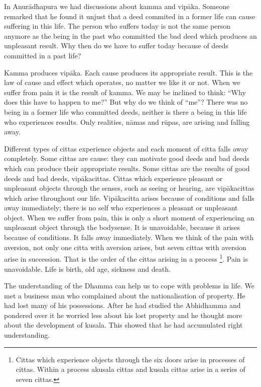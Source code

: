 In Anurādhapura we had discussions about kamma and vipāka. Someone
remarked that he found it unjust that a deed commited in a former life
can cause suffering in this life. The person who suffers today is not
the same person anymore as the being in the past who committed the bad
deed which produces an unpleasant result. Why then do we have to suffer
today because of deeds committed in a past life?

Kamma produces vipāka. Each cause produces its appropriate result. This
is the law of cause and effect which operates, no matter we like it or
not. When we suffer from pain it is the result of kamma. We may be
inclined to think: ``Why does this have to happen to me?'' But why do we
think of ``me''? There was no being in a former life who committed
deeds, neither is there a being in this life who experiences results.
Only realities, nāmas and rūpas, are arising and falling away.

Different types of cittas experience objects and each moment of citta
falls away completely. Some cittas are cause: they can motivate good
deeds and bad deeds which can produce their appropriate results. Some
cittas are the results of good deeds and bad deeds, vipākacittas. Cittas
which experience pleasant or unpleasant objects through the senses, such
as seeing or hearing, are vipākacittas which arise throughout our life.
Vipākacitta arises because of conditions and falls away immediately;
there is no self who experiences a pleasant or unpleasant object. When
we suffer from pain, this is only a short moment of experiencing an
unpleasant object through the bodysense. It is unavoidable, because it
arises because of conditions. It falls away immediately. When we think
of the pain with aversion, not only one citta with aversion arises, but
seven cittas with aversion arise in succession. That is the order of the
cittas arising in a process
\footnote{Cittas which experience objects
through the six doors arise in processes of cittas. Within a process
akusala cittas and kusala cittas arise in a series of seven cittas.
}.
Pain is unavoidable. Life is birth, old age, sickness and death.

The understanding of the Dhamma can help us to cope with problems in
life. We met a business man who complained about the nationalisation of
property. He had lost many of his possessions. After he had studied the
Abhidhamma and pondered over it he worried less about his lost property
and he thought more about the development of kusala. This showed that he
had accumulated right understanding.

